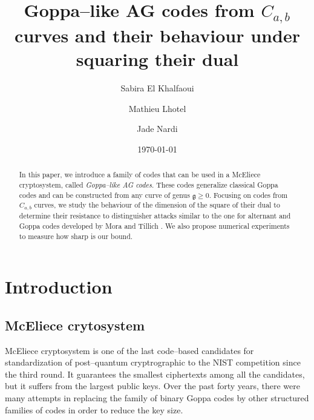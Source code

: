\documentclass[a4paper]{amsart}
\title{Goppa--like AG codes from $C_{a,b}$ curves and their behaviour under squaring their dual}
\author{Sabira El Khalfaoui}
\author{Mathieu Lhotel}
\author{Jade Nardi}
\date{\today}
\theoremstyle{definition}
\theoremstyle{remark}
\begin{document}
\maketitle

\begin{abstract}
In this paper, we introduce a family of codes that can be used in a McEliece cryptosystem, called \emph{Goppa--like AG codes}. These codes generalize classical Goppa codes and can be constructed from any curve of genus $\mathfrak{g} \geq 0$. Focusing on codes from $C_{a,b}$ curves, we study the behaviour of the dimension of the square of their dual to determine their resistance to distinguisher attacks similar to the one for alternant and Goppa codes developed by Mora and Tillich \cite{MT21}. We also propose numerical experiments to measure how sharp is our bound.
\end{abstract}
 

\section*{Introduction}

\subsection*{McEliece crytosystem}
McEliece cryptosystem is one of the last code--based candidates for standardization of post--quantum cryptrographic to the NIST competition since the third round. It guarantees the smallest ciphertexts among all the candidates, but it suffers from the largest public keys. Over the past forty years, there were many attempts in replacing the family of binary Goppa codes by other structured families of codes in order to reduce the key size.
\end{document}
